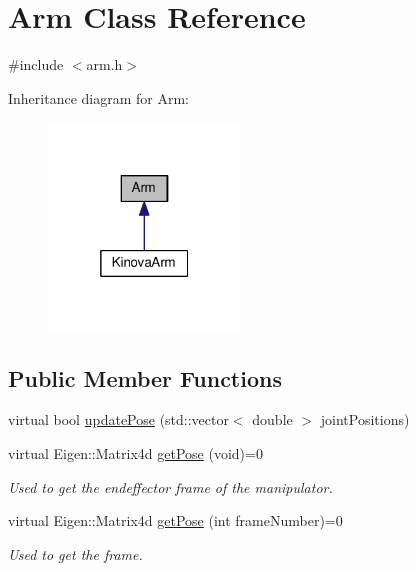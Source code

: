 \hypertarget{class_arm}{}\section{Arm Class Reference}
\label{class_arm}


{\ttfamily \#include $<$arm.\+h$>$}



Inheritance diagram for Arm\+:\nopagebreak
\begin{figure}[H]
\begin{center}
\leavevmode
\includegraphics[width=145pt]{class_arm__inherit__graph}
\end{center}
\end{figure}
\subsection*{Public Member Functions}
\begin{DoxyCompactItemize}
\item 
virtual bool \hyperlink{class_arm_a9bfe3a3f230c8fa8a39f88cce2d6b597}{update\+Pose} (std\+::vector$<$ double $>$ joint\+Positions)
\item 
virtual Eigen\+::\+Matrix4d \hyperlink{class_arm_af89cd963a4321584dfb8f9715c02f5be}{get\+Pose} (void)=0\hypertarget{class_arm_af89cd963a4321584dfb8f9715c02f5be}{}\label{class_arm_af89cd963a4321584dfb8f9715c02f5be}

\begin{DoxyCompactList}\small\item\em Used to get the endeffector frame of the manipulator. \end{DoxyCompactList}\item 
virtual Eigen\+::\+Matrix4d \hyperlink{class_arm_a994d35ca0dae04725fe0921c4f7d7e38}{get\+Pose} (int frame\+Number)=0\hypertarget{class_arm_a994d35ca0dae04725fe0921c4f7d7e38}{}\label{class_arm_a994d35ca0dae04725fe0921c4f7d7e38}

\begin{DoxyCompactList}\small\item\em Used to get the frame. \end{DoxyCompactList}\end{DoxyCompactItemize}
